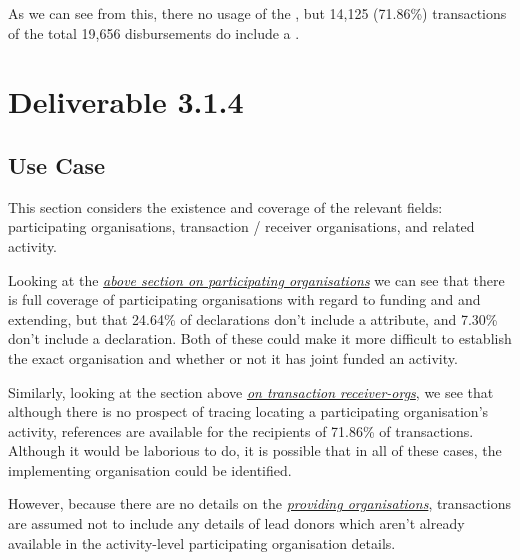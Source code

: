 \documentclass[letterpaper,10pt,english]{sphinxmanual}
\begin{document}
As we can see from this, there no usage of the
, but 14,125 (71.86\%) transactions of the
total 19,656 disbursements do include a .


\section{Deliverable 3.1.4}
\label{\detokenize{Global Affairs Canada - Compliance Report:Deliverable-3.1.4}}

\subsection{Use Case}
\label{\detokenize{Global Affairs Canada - Compliance Report:Use-Case}}

This section considers the existence and coverage of the relevant
fields: participating organisations, transaction / receiver
organisations, and related activity.

Looking at the {\hyperref[\detokenize{Global Affairs Canada - Compliance Report:Participating-Organisations}]{\emph{above section on participating
organisations}}} we can see that there is
full coverage of participating organisations with regard to funding and
and extending, but that 24.64\% of declarations don't include a 
attribute, and 7.30\% don't include a  declaration. Both of
these could make it more difficult to establish the exact organisation
and whether or not it has joint funded an activity.

Similarly, looking at the section above {\hyperref[\detokenize{Global Affairs Canada - Compliance Report:Transaction-Receiver-Organisation}]{\emph{on transaction
receiver-orgs}}}, we see that
although there is no prospect of tracing locating a participating
organisation's activity, references are available for the recipients of
71.86\% of transactions. Although it would be laborious to do, it is
possible that in all of these cases, the implementing organisation could
be identified.

However, because there are no details on the {\hyperref[\detokenize{Global Affairs Canada - Compliance Report:Transaction-Provider-Organisation}]{\emph{providing
organisations}}}, transactions are
assumed not to include any details of lead donors which aren't already
available in the activity-level participating organisation details.
\end{document}
